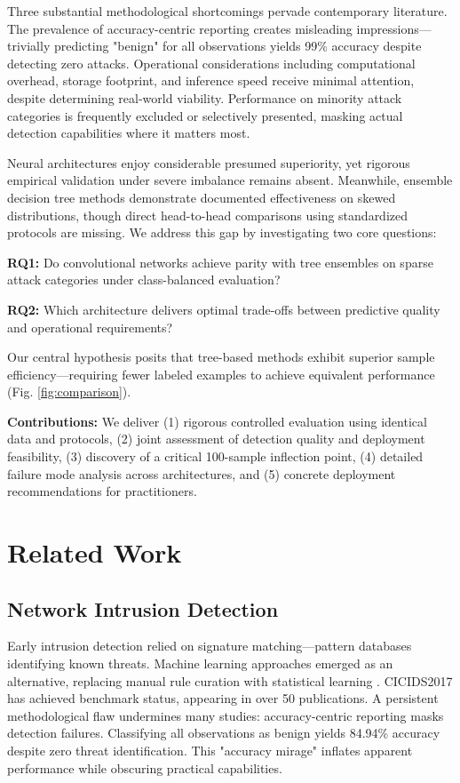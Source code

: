 \documentclass[10pt,twocolumn]{article}
\begin{document}
Three substantial methodological shortcomings pervade contemporary literature. The prevalence of accuracy-centric reporting creates misleading impressions---trivially predicting "benign" for all observations yields 99\% accuracy despite detecting zero attacks. Operational considerations including computational overhead, storage footprint, and inference speed receive minimal attention, despite determining real-world viability. Performance on minority attack categories is frequently excluded or selectively presented, masking actual detection capabilities where it matters most.

Neural architectures enjoy considerable presumed superiority, yet rigorous empirical validation under severe imbalance remains absent. Meanwhile, ensemble decision tree methods \cite{breiman2001random,chen2016xgboost} demonstrate documented effectiveness on skewed distributions, though direct head-to-head comparisons using standardized protocols are missing. We address this gap by investigating two core questions:

\textbf{RQ1:} Do convolutional networks achieve parity with tree ensembles on sparse attack categories under class-balanced evaluation?

\textbf{RQ2:} Which architecture delivers optimal trade-offs between predictive quality and operational requirements?

Our central hypothesis posits that tree-based methods exhibit superior sample efficiency---requiring fewer labeled examples to achieve equivalent performance (Fig. \ref{fig:comparison}).

\textbf{Contributions:} We deliver (1) rigorous controlled evaluation using identical data and protocols, (2) joint assessment of detection quality and deployment feasibility, (3) discovery of a critical 100-sample inflection point, (4) detailed failure mode analysis across architectures, and (5) concrete deployment recommendations for practitioners.

\section{Related Work}

\subsection{Network Intrusion Detection}

Early intrusion detection relied on signature matching—pattern databases identifying known threats. Machine learning approaches emerged as an alternative, replacing manual rule curation with statistical learning \cite{buczak2016survey}. CICIDS2017 \cite{sharafaldin2018cicids} has achieved benchmark status, appearing in over 50 publications. A persistent methodological flaw undermines many studies: accuracy-centric reporting masks detection failures. Classifying all observations as benign yields 84.94\% accuracy despite zero threat identification. This "accuracy mirage" inflates apparent performance while obscuring practical capabilities.
\end{document}
